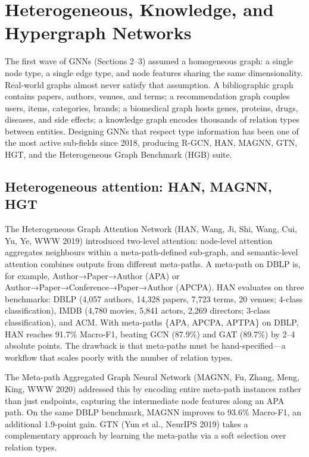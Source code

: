 \documentclass{article}
\begin{document}
\section{Heterogeneous, Knowledge, and Hypergraph Networks}\label{sec:heterogeneous-knowledge-and-hypergraph-networks}
The first wave of GNNs (Sections 2--3) assumed a homogeneous graph: a single node type, a single edge type, and node features sharing the same dimensionality. Real-world graphs almost never satisfy that assumption. A bibliographic graph contains papers, authors, venues, and terms; a recommendation graph couples users, items, categories, brands; a biomedical graph hosts genes, proteins, drugs, diseases, and side effects; a knowledge graph encodes thousands of relation types between entities. Designing GNNs that respect type information has been one of the most active sub-fields since 2018, producing R-GCN, HAN, MAGNN, GTN, HGT, and the Heterogeneous Graph Benchmark (HGB) suite.

\subsection{Heterogeneous attention: HAN, MAGNN, HGT}\label{heterogeneous-attention-han-magnn-hgt}

The Heterogeneous Graph Attention Network (HAN, Wang, Ji, Shi, Wang, Cui, Yu, Ye, WWW 2019) introduced two-level attention: node-level attention aggregates neighbours within a meta-path-defined sub-graph, and semantic-level attention combines outputs from different meta-paths. A meta-path on DBLP is, for example, Author→Paper→Author (APA) or Author→Paper→Conference→Paper→Author (APCPA). HAN evaluates on three benchmarks: DBLP (4,057 authors, 14,328 papers, 7,723 terms, 20 venues; 4-class classification), IMDB (4,780 movies, 5,841 actors, 2,269 directors; 3-class classification), and ACM. With meta-paths \{APA, APCPA, APTPA\} on DBLP, HAN reaches 91.7\% Macro-F1, beating GCN (87.9\%) and GAT (89.7\%) by 2--4 absolute points. The drawback is that meta-paths must be hand-specified---a workflow that scales poorly with the number of relation types.

The Meta-path Aggregated Graph Neural Network (MAGNN, Fu, Zhang, Meng, King, WWW 2020) addressed this by encoding entire meta-path instances rather than just endpoints, capturing the intermediate node features along an APA path. On the same DBLP benchmark, MAGNN improves to 93.6\% Macro-F1, an additional 1.9-point gain. GTN (Yun et al., NeurIPS 2019) takes a complementary approach by learning the meta-paths via a soft selection over relation types.
\end{document}
